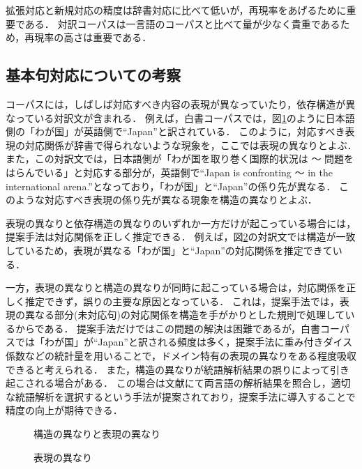 拡張対応と新規対応の精度は辞書対応に比べて低いが，再現率をあげるために重要である．
対訳コーパスは一言語のコーパスと比べて量が少なく貴重であるため，再現率の高さは重要である．



\subsection{基本句対応についての考察}



コーパスには，しばしば対応すべき内容の表現が異なっていたり，依存構造が異なっている対訳文が含まれる．
例えば，白書コーパスでは，図\ref{f_f3.eps}のように日本語側の「わが国」が英語側で``Japan''と訳されている．
このように，対応すべき表現の対応関係が辞書で得られないような現象を，ここでは表現の異なりとよぶ．
また，この対訳文では，日本語側が「わが国を取り巻く国際的状況は 〜 問題をはらんでいる」と対応する部分が，英語側で``Japan is confronting 〜 in the international arena.''となっており，「わが国」と``Japan''の係り先が異なる．
このような対応すべき表現の係り先が異なる現象を構造の異なりとよぶ．

表現の異なりと依存構造の異なりのいずれか一方だけが起こっている場合には，提案手法は対応関係を正しく推定できる．
例えば，図\ref{f_f4.eps}の対訳文では構造が一致しているため，表現が異なる「わが国」と``Japan''の対応関係を推定できている．

一方，表現の異なりと構造の異なりが同時に起こっている場合は，対応関係を正しく推定できず，誤りの主要な原因となっている．
これは，提案手法では，表現の異なる部分(未対応句)の対応関係を構造を手がかりとした規則で処理しているからである．
提案手法だけではこの問題の解決は困難であるが，白書コーパスでは「わが国」が``Japan''と訳される頻度は多く，提案手法に重み付きダイス係数などの統計量を用いることで，ドメイン特有の表現の異なりをある程度吸収できると考えられる．
また，構造の異なりが統語解析結果の誤りによって引き起こされる場合がある．
この場合は文献\cite{Matsumoto1993}にて両言語の解析結果を照合し，適切な統語解析を選択するという手法が提案されており，提案手法に導入することで精度の向上が期待できる．



\begin{figure}
\begin{center}
 \leavevmode
 \epsfxsize=14cm
 \epsfysize=4.6cm
\end{center}
\caption{構造の異なりと表現の異なり}
\label{f_f3.eps}
\end{figure}

\begin{figure}
\begin{center}
 \leavevmode
 \epsfxsize=14cm
 \epsfysize=4cm
\end{center}
\caption{表現の異なり}
\label{f_f4.eps}
\end{figure}


